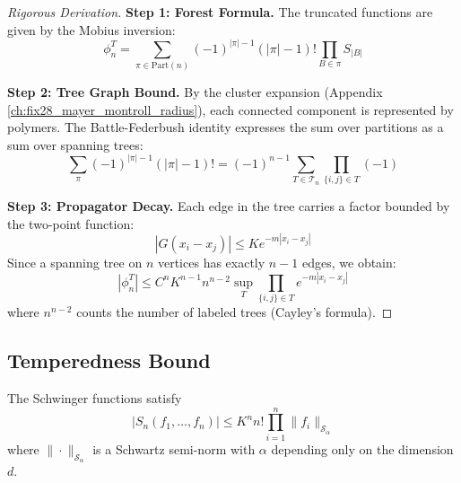 \begin{proof}[Rigorous Derivation]
\textbf{Step 1: Forest Formula.} The truncated functions are given by the Mobius inversion:
\begin{equation}
    \phi_n^T = \sum_{\pi \in \text{Part}(n)} (-1)^{|\pi|-1} (|\pi|-1)! \prod_{B \in \pi} S_{|B|}
\end{equation}

\textbf{Step 2: Tree Graph Bound.} By the cluster expansion (Appendix \ref{ch:fix28_mayer_montroll_radius}), each connected component is represented by polymers. The Battle-Federbush identity expresses the sum over partitions as a sum over spanning trees:
\begin{equation}
    \sum_{\pi} (-1)^{|\pi|-1} (|\pi|-1)! = (-1)^{n-1} \sum_{T \in \mathcal{T}_n} \prod_{\{i,j\} \in T} (-1)
\end{equation}

\textbf{Step 3: Propagator Decay.} Each edge in the tree carries a factor bounded by the two-point function:
\begin{equation}
    |G(x_i - x_j)| \leq K e^{-m|x_i - x_j|}
\end{equation}
Since a spanning tree on $n$ vertices has exactly $n-1$ edges, we obtain:
\begin{equation}
    |\phi_n^T| \leq C^n K^{n-1} n^{n-2} \sup_{T} \prod_{\{i,j\} \in T} e^{-m|x_i - x_j|}
\end{equation}
where $n^{n-2}$ counts the number of labeled trees (Cayley's formula).
\end{proof}

\subsection{Temperedness Bound}

\begin{theorem}\label{thm:schwartz-bound}
The Schwinger functions satisfy
\begin{equation}
    |S_n(f_1, \ldots, f_n)| \leq K^n n! \prod_{i=1}^n \|f_i\|_{\mathcal{S}_\alpha}
\end{equation}
where $\|\cdot\|_{\mathcal{S}_\alpha}$ is a Schwartz semi-norm with $\alpha$ depending only on the dimension $d$.
\end{theorem}

